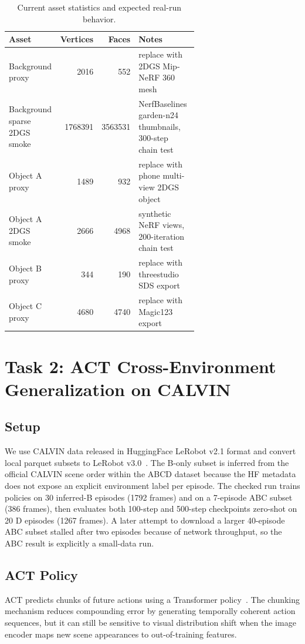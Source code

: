 \documentclass[10pt]{article}
\begin{document}
\begin{table}[h]
\centering
\caption{Current asset statistics and expected real-run behavior.}
\begin{tabular}{p{0.28\linewidth}rrp{0.36\linewidth}}
\toprule
Asset & Vertices & Faces & Notes \\
\midrule
Background proxy & 2016 & 552 & replace with 2DGS Mip-NeRF 360 mesh \\
Background sparse 2DGS smoke & 1768391 & 3563531 & NerfBaselines garden-n24 thumbnails, 300-step chain test \\
Object A proxy & 1489 & 932 & replace with phone multi-view 2DGS object \\
Object A 2DGS smoke & 2666 & 4968 & synthetic NeRF views, 200-iteration chain test \\
Object B proxy & 344 & 190 & replace with threestudio SDS export \\
Object C proxy & 4680 & 4740 & replace with Magic123 export \\
\bottomrule
\end{tabular}
\end{table}

\section{Task 2: ACT Cross-Environment Generalization on CALVIN}

\subsection{Setup}
We use CALVIN data released in HuggingFace LeRobot v2.1 format and convert local parquet subsets to LeRobot v3.0~\cite{mees2022calvin}. The B-only subset is inferred from the official CALVIN scene order within the ABCD dataset because the HF metadata does not expose an explicit environment label per episode. The checked run trains policies on 30 inferred-B episodes (1792 frames) and on a 7-episode ABC subset (386 frames), then evaluates both 100-step and 500-step checkpoints zero-shot on 20 D episodes (1267 frames). A later attempt to download a larger 40-episode ABC subset stalled after two episodes because of network throughput, so the ABC result is explicitly a small-data run.

\subsection{ACT Policy}
ACT predicts chunks of future actions using a Transformer policy~\cite{zhao2023act}. The chunking mechanism reduces compounding error by generating temporally coherent action sequences, but it can still be sensitive to visual distribution shift when the image encoder maps new scene appearances to out-of-training features.
\end{document}
